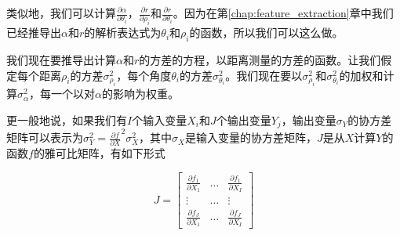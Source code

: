 类似地，我们可以计算$\frac{\partial\alpha}{\partial\theta_i}$，$\frac{\partial r}{\partial\rho_i}$和$\frac{\partial r}{\partial\theta_i}$。因为在第\ref{chap:feature_extraction}章中我们已经推导出$\alpha$和$r$的解析表达式为$\theta_i$和$\rho_i$的函数，所以我们可以这么做。


我们现在要推导出计算$\alpha$和$r$的方差的方程，以距离测量的方差的函数。让我们假定每个距离$\rho_i$的方差$\sigma^2_{\rho_i}$，每个角度$\theta_i$的方差$\sigma^2_{\theta_i}$。我们现在要以$\sigma^2_{\rho_i}$和$\sigma^2_{\theta_i}$的加权和计算$\sigma^2_{\alpha}$，每一个以对$\alpha$的影响为权重。


更一般地说，如果我们有$I$个输入变量$X_i$和$J$个输出变量$Y_j$，输出变量$\sigma_Y$的协方差矩阵可以表示为$\sigma_Y^2=\frac{\partial f}{\partial X}^2\sigma_X^2$，其中$\sigma_X$是输入变量的协方差矩阵，$J$是从$X$计算$Y$的函数$f$的雅可比矩阵，有如下形式

\begin{equation}
J=\left[
\begin{array}{ccc}
  \frac{\partial f_1}{\partial X_1} & \ldots & \frac{\partial f_1}{\partial X_I}\\
  \vdots & \ldots & \vdots\\
  \frac{\partial f_J}{\partial X_1} & \ldots & \frac{\partial f_J}{\partial X_I}
 \end{array}
 \right]
\end{equation}


